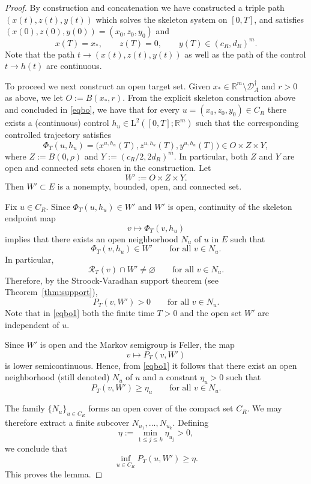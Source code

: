 \documentclass[11pt, a4paper,leqno]{amsart}
\theoremstyle{definition}
\numberwithin{equation}{section}
\newcommand{\R}{\mathbb R}
\begin{document}
\begin{proof}
\noindent
By construction and concatenation we have constructed a triple path $(x(t),z(t),y(t))$ which solves the skeleton system
on $[0,T]$, and satisfies $(x(0),z(0),y(0))=(x_0,z_0,y_0)$ and
\begin{equation}\label{eqbo}
x(T)=x_\ast,
\qquad
z(T)=0, \qquad y(T)\in (c_R,d_R)^m.
\end{equation}
Note that the path $t\to (x(t),z(t),y(t))$ as well as the path of the control $t\to h(t)$ are continuous.

To proceed we next construct an open target set. Given $x_\ast\in \R^m\setminus \mathcal D_A^\dagger$ and $r>0$ as above, we let $ O:=B(x_\ast,r)$. From the explicit skeleton construction above and concluded in \eqref{eqbo}, we have that for every $u=(x_0,z_0,y_0)\in C_R$ there exists a (continuous) control $h_u\in \mathrm L^2([0,T];\R^m)$ such that the corresponding
controlled trajectory satisfies
\[
\Phi_T(u,h_u)=\bigl(x^{u,h_u}(T),z^{u,h_u}(T),y^{u,h_u}(T)\bigr)
\in O\times Z\times Y,
\]
where $Z:=B(0,\rho)$ and $Y:=(c_R/2,2d_R)^m$. In particular, both $Z$ and $Y$ are open and connected sets chosen in the construction. Let
\[
W':=O\times Z\times Y.
\]
Then $W'\subset E$ is a nonempty, bounded, open, and connected set.


Fix \(u\in C_R\). Since \(\Phi_T(u,h_u)\in W'\) and \(W'\) is open, continuity of the
skeleton endpoint map
\[
v\mapsto \Phi_T(v,h_u)
\]
implies that there exists an open neighborhood \(N_u\) of \(u\) in \(E\) such that
\[
\Phi_T(v,h_u)\in W'
\qquad\text{for all }v\in N_u.
\]
In particular,
\[
\mathcal R_T(v)\cap W'\neq\varnothing
\qquad\text{for all }v\in N_u.
\]
Therefore, by the Stroock-Varadhan support theorem (see Theorem~\ref{thm:support}),
\begin{equation}\label{eqbo1}
P_T(v,W')>0
\qquad\text{for all }v\in N_u.
\end{equation}
Note that in \eqref{eqbo1} both the finite time \(T>0\) and the open set \(W'\)
are independent of \(u\).

Since \(W'\) is open and the Markov semigroup is Feller, the map
\[
v\mapsto P_T(v,W')
\]
is lower semicontinuous. Hence, from \eqref{eqbo1} it follows that there exist
an open neighborhood (still denoted) \(N_u\) of \(u\) and a constant \(\eta_u>0\)
such that
\[
P_T(v,W')\ge \eta_u
\qquad \text{for all } v\in N_u.
\]

The family \(\{N_u\}_{u\in C_R}\) forms an open cover of the compact set \(C_R\).
We may therefore extract a finite subcover \(N_{u_1},\dots,N_{u_k}\).
Defining
\[
\eta:=\min_{1\le j\le k}\eta_{u_j}>0,
\]
we conclude that
\[
\inf_{u\in C_R} P_T(u,W')\ge \eta .
\]
This proves the lemma.
\end{proof}
\end{document}
